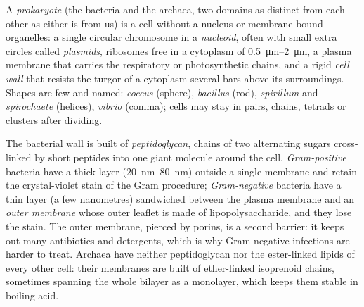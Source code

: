 \begin{definition}\label{def:b2:unicellular-diversity:prokaryote}
A \emph{prokaryote} (the bacteria and the archaea,
two domains as distinct from each other as either is from us) is a
cell without a nucleus or membrane-bound organelles: a single
circular chromosome in a \emph{nucleoid}, often with
small extra circles called \emph{plasmids}, ribosomes
free in a cytoplasm of \qtyrange{0.5}{2}{\micro m}, a plasma membrane
that carries the respiratory or photosynthetic chains, and a rigid
\emph{cell wall} that resists the turgor
of a cytoplasm several bars above its surroundings. Shapes are few
and named: \emph{coccus} (sphere), \emph{bacillus} (rod),
\emph{spirillum} and \emph{spirochaete} (helices), \emph{vibrio}
(comma); cells may stay in pairs, chains, tetrads or clusters after
dividing.
\end{definition}

\begin{proposition}\label{prop:b2:unicellular-diversity:gram}
The bacterial wall is built of \emph{peptidoglycan}, chains of two
alternating sugars cross-linked by short peptides into one giant
molecule around the cell. \emph{Gram-positive} bacteria have a thick
layer (\qtyrange{20}{80}{nm}) outside a single membrane and retain
the crystal-violet stain of the Gram procedure; \emph{Gram-negative}
bacteria have a thin layer (a few nanometres) sandwiched between the
plasma membrane and an \emph{outer membrane} whose outer leaflet is
made of lipopolysaccharide, and they lose the stain. The outer
membrane, pierced by porins, is a second barrier: it keeps out many
antibiotics and detergents, which is why Gram-negative infections
are harder to treat. Archaea have neither peptidoglycan nor the
ester-linked lipids of every other cell: their membranes are built
of ether-linked isoprenoid chains, sometimes spanning the whole
bilayer as a monolayer, which keeps them stable in boiling acid.
\end{proposition}

